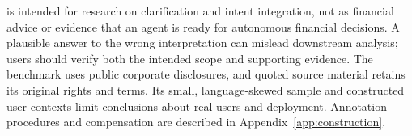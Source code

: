 \fininteract is intended for research on clarification and intent integration, not as financial advice or evidence that an agent is ready for autonomous financial decisions. A plausible answer to the wrong interpretation can mislead downstream analysis; users should verify both the intended scope and supporting evidence. The benchmark uses public corporate disclosures, and quoted source material retains its original rights and terms. Its small, language-skewed sample and constructed user contexts limit conclusions about real users and deployment. Annotation procedures and compensation are described in Appendix~\ref{app:construction}.
